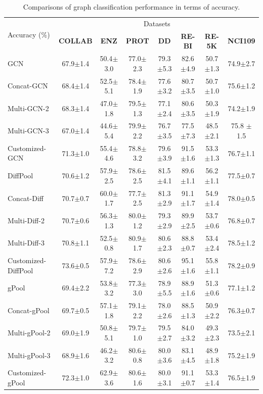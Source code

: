 \documentclass[11pt,dvipdfm]{article}
\begin{document}
\begin{table}
\small
\centering
 \caption{Comparisons of graph classification performance in terms of accuracy.}  \label{table:graph_classfication}

\begin{tabular*}{\textwidth}{@{\extracolsep{\fill}}l|ccccccc@{\extracolsep{\fill}}}
\toprule%


  \multirow{2}{*}{Accuracy ($\%$)}&\multicolumn{7}{c}{Datasets} \\ \cline{2-8}
  
                  & \textbf{COLLAB}   & \textbf{ENZ}  & \textbf{PROT}     & \textbf{DD}       & \textbf{RE-BI}    & \textbf{RE-5K}       & \textbf{NCI109} \\ \bottomrule
GCN              & 67.9$\pm$1.4 & 50.4$\pm$3.0 & 77.0$\pm$2.3 & 79.3$\pm$5.3 & 82.6$\pm$4.9 & 50.7$\pm$1.3 & 74.9$\pm$2.7    \\
Concat-GCN       & 68.4$\pm$1.4 & 52.5$\pm$5.1 & 78.4$\pm$1.9 & 77.6$\pm$3.2 & 80.7$\pm$3.5 & 50.7$\pm$1.0 & 75.6$\pm$1.2 \\
Multi-GCN-2    &68.3$\pm$1.4 & 47.0$\pm$1.8 &  79.5$\pm$1.3 & 77.1$\pm$2.4 & 80.6$\pm$3.5 & 50.3$\pm$1.9 & 74.2$\pm$1.9 \\
Multi-GCN-3  &67.0$\pm$1.4 &44.6$\pm$5.4 &79.9$\pm$2.2  & 76.7$\pm$3.5  & 77.5$\pm$7.3 &48.5$\pm$2.1 &75.8 $\pm$1.5\\
Customized-GCN  & 71.3$\pm$1.0 & 55.4$\pm$4.6 & 78.8$\pm$3.2 & 79.6$\pm$3.9 & 91.5$\pm$1.6 & 53.3$\pm$1.3 & 76.7$\pm$1.1 \\ \midrule
DiffPool     & 70.6$\pm$1.2 & 57.9$\pm$2.5 & 78.6$\pm$2.5 & 81.5$\pm$4.1 & 89.6$\pm$1.1 & 56.2$\pm$1.1& 77.5$\pm$0.7 \\
Concat-Diff & 70.7$\pm$0.7 & 60.0$\pm$1.7 & 77.7$\pm$2.5 & 81.3$\pm$2.9 & 91.1$\pm$1.7 & 54.9$\pm$1.4 & 78.0$\pm$0.5 \\
Multi-Diff-2   &70.7$\pm$0.6 &56.3$\pm$1.3  &80.0$\pm$1.2 &79.3$\pm$2.9 &89.9$\pm$2.5 &53.7$\pm$0.6 &76.8$\pm$0.7 \\
Multi-Diff-3  &70.8$\pm$1.1 &52.5$\pm$0.8 &80.9$\pm$1.7 &80.6$\pm$2.3 &88.8$\pm$0.7 &53.4$\pm$2.4 &78.5$\pm$1.2 \\
Customized-DiffPool  &73.6$\pm$0.5 &57.9$\pm$7.2 &78.6$\pm$2.9 &80.6$\pm$2.6 &95.1$\pm$1.6 &55.8$\pm$1.1 & 78.2$\pm$0.9 \\ \midrule
gPool   &69.4$\pm$2.2 &53.8$\pm$3.2 &77.3$\pm$3.0 &78.9$\pm$5.5 &88.9$\pm$1.6 &51.3$\pm$0.6 &77.1$\pm$1.2 \\
Concat-gPool &69.7$\pm$0.5 &57.1$\pm$1.8 &79.1$\pm$2.2 &78.0$\pm$2.6 &88.5$\pm$1.3 &50.9$\pm$2.2 &76.3$\pm$0.7 \\ 
Multi-gPool-2 &69.0$\pm$1.9 &50.8$\pm$5.1  &79.7$\pm$1.0 &79.5$\pm$2.7 &84.0$\pm$3.2 &49.3$\pm$2.3 &73.5$\pm$2.1 \\
Multi-gPool-3 &68.9$\pm$1.6 &46.2$\pm$3.2  &80.6$\pm$0.8  &80.0$\pm$3.6  &83.1$\pm$4.5 &48.9$\pm$1.8 &75.2$\pm$1.9 \\
Customized-gPool  & 72.3$\pm$1.0 & 62.9$\pm$3.6 & 80.6$\pm$1.6 & 80.0$\pm$3.1 &91.1$\pm$0.7 &53.3$\pm$1.4 &76.5$\pm$1.9 \\ \bottomrule

\end{tabular*}
\end{table}
\end{document}
